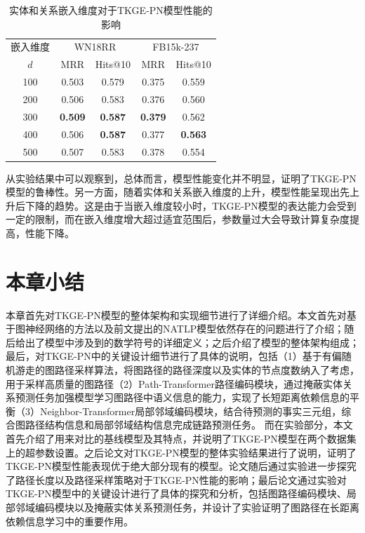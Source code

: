 \begin{table}[htbp]
    \begin{center}
        \caption{实体和关系嵌入维度对于TKGE-PN模型性能的影响}
        \renewcommand{\arraystretch}{1.5}
        \begin{tabular}{*{5}{c}}
            \toprule
            嵌入维度& \multicolumn{2}{c}{WN18RR} & \multicolumn{2}{c}{FB15k-237}\\
            \cmidrule(lr){2-3}\cmidrule(lr){4-5}
            $d$&MRR&Hits@10&MRR&Hits@10\\
            \midrule
            100	&0.503&0.579&0.375&0.559\\
            200	&0.506&0.583&0.376&0.560\\
            300	&\textbf{0.509}&\textbf{0.587}&\textbf{0.379}&0.562\\
            400	&0.506&\textbf{0.587}&0.377&\textbf{0.563}\\
            500	&0.507&0.583&0.378&0.554\\
            \bottomrule
        \end{tabular}
        \label{dimension_2}
    \end{center}
\end{table}


从实验结果中可以观察到，总体而言，模型性能变化并不明显，证明了TKGE-PN模型的鲁棒性。另一方面，随着实体和关系嵌入维度的上升，模型性能呈现出先上升后下降的趋势。这是由于当嵌入维度较小时，TKGE-PN模型的表达能力会受到一定的限制，而在嵌入维度增大超过适宜范围后，参数量过大会导致计算复杂度提高，性能下降。

\section{本章小结}

本章首先对TKGE-PN模型的整体架构和实现细节进行了详细介绍。本文首先对基于图神经网络的方法以及前文提出的NATLP模型依然存在的问题进行了介绍；随后给出了模型中涉及到的数学符号的详细定义；之后介绍了模型的整体架构组成；最后，对TKGE-PN中的关键设计细节进行了具体的说明，包括（1）基于有偏随机游走的图路径采样算法，将图路径的路径深度以及实体的节点度数纳入了考虑，用于采样高质量的图路径（2）Path-Transformer路径编码模块，通过掩蔽实体关系预测任务加强模型学习图路径中语义信息的能力，实现了长短距离依赖信息的平衡（3）Neighbor-Transformer局部邻域编码模块，结合待预测的事实三元组，综合图路径结构信息和局部邻域结构信息完成链路预测任务。
而在实验部分，本文首先介绍了用来对比的基线模型及其特点，并说明了TKGE-PN模型在两个数据集上的超参数设置。之后论文对TKGE-PN模型的整体实验结果进行了说明，证明了TKGE-PN模型性能表现优于绝大部分现有的模型。论文随后通过实验进一步探究了路径长度以及路径采样策略对于TKGE-PN性能的影响；最后论文通过实验对TKGE-PN模型中的关键设计进行了具体的探究和分析，包括图路径编码模块、局部邻域编码模块以及掩蔽实体关系预测任务，并设计了实验证明了图路径在长距离依赖信息学习中的重要作用。
